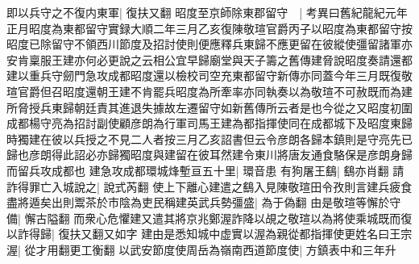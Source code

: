 即以兵守之不復内東軍|{
	復扶又翻}
昭度至京師除東郡留守　|{
	考異曰舊紀龍紀元年正月昭度為東都留守實録大順二年三月乙亥復陳敬瑄官爵丙子以昭度為東都留守按昭度已除留守不領西川節度及招討使則便應釋兵東歸不應更留在彼縱使彊留諸軍亦安肯稟服王建亦何必更說之云相公宜早歸廟堂與天子籌之舊傳建脅說昭度奏請還都建以重兵守劒門急攻成都昭度還以檢校司空充東都留守新傳亦同蓋今年三月既復敬瑄官爵但召昭度還朝王建不肯罷兵昭度為所牽率亦同執奏以為敬瑄不可赦既而為建所脅授兵東歸朝廷責其進退失據故左遷留守如新舊傳所云者是也今從之又昭度初圍成都楊守亮為招討副使顧彦朗為行軍司馬王建為都指揮使同在成都城下及昭度東歸時獨建在彼以兵授之不見二人者按三月乙亥詔書但云令彦朗各歸本鎮則是守亮先已歸也彦朗得此詔必亦歸獨昭度與建留在彼耳然建令東川將唐友通食駱保是彦朗身歸而留兵攻成都也}
建急攻成都環城烽塹亘五十里|{
	環音患}
有狗屠王鷂|{
	鷂亦肖翻}
請詐得罪亡入城說之|{
	說式芮翻}
使上下離心建遣之鷂入見陳敬瑄田令孜則言建兵疲食盡將遁矣出則鬻茶於市陰為吏民稱建英武兵勢彊盛|{
	為于偽翻}
由是敬瑄等懈於守備|{
	懈古隘翻}
而衆心危懼建又遣其將京兆鄭渥詐降以覘之敬瑄以為將使乘城既而復以詐得歸|{
	復扶又翻又如字}
建由是悉知城中虚實以渥為親從都指揮使更姓名曰王宗渥|{
	從才用翻更工衡翻}
以武安節度使周岳為嶺南西道節度使|{
	方鎮表中和三年升}



